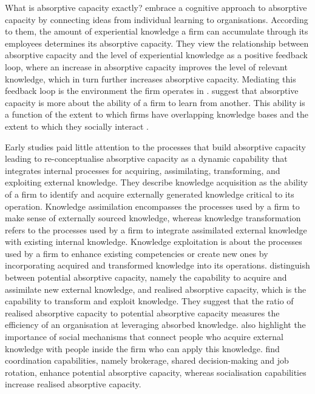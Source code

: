 What is absorptive capacity exactly? \citet{cohen1990absorptive} embrace a cognitive approach to absorptive capacity by connecting ideas from individual learning to organisations. According to them, the amount of experiential knowledge a firm can accumulate through its employees determines its absorptive capacity. They view the relationship between absorptive capacity and the level of experiential knowledge as a positive feedback loop, where an increase in absorptive capacity improves the level of relevant knowledge, which in turn further increases absorptive capacity. Mediating this feedback loop is the environment the firm operates in \citep{van1999coevolution}. \citet{lane1998relative} suggest that absorptive capacity is more about the ability of a firm to learn from another. This ability is a function of the extent to which firms have overlapping knowledge bases and the extent to which they socially interact \citep{dyer1998relational,nooteboom2000learning}. \medskip

Early studies paid little attention to the processes that build absorptive capacity leading \citet{zahra2002absorptive} to re-conceptualise absorptive capacity as a dynamic capability that integrates internal processes for acquiring, assimilating, transforming, and exploiting external knowledge. They describe knowledge acquisition as the ability of a firm to identify and acquire externally generated knowledge critical to its operation. Knowledge assimilation encompasses the processes used by a firm to make sense of externally sourced knowledge, whereas knowledge transformation refers to the processes used by a firm to integrate assimilated external knowledge with existing internal knowledge. Knowledge exploitation is about the processes used by a firm to enhance existing competencies or create new ones by incorporating acquired and transformed knowledge into its operations. \citet{zahra2002absorptive} distinguish between potential absorptive capacity, namely the capability to acquire and assimilate new external knowledge, and realised absorptive capacity, which is the capability to transform and exploit knowledge. They suggest that the ratio of realised absorptive capacity to potential absorptive capacity measures the efficiency of an organisation at leveraging absorbed knowledge. \citet{zahra2002absorptive} also highlight the importance of social mechanisms that connect people who acquire external knowledge with people inside the firm who can apply this knowledge. \citet{jansen2005managing} find coordination capabilities, namely brokerage, shared decision-making and job rotation, enhance potential absorptive capacity, whereas socialisation capabilities increase realised absorptive capacity. \medskip

